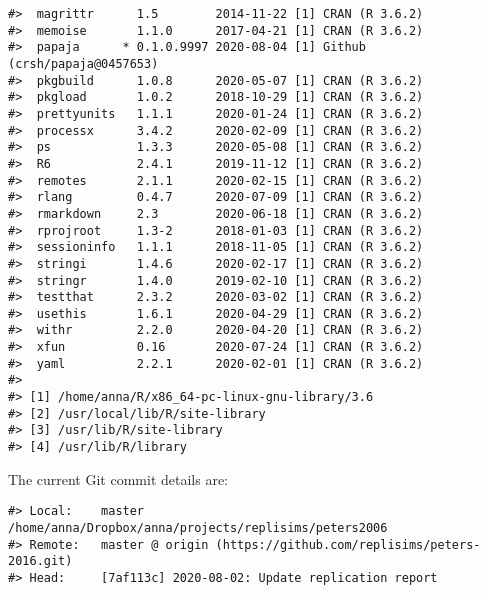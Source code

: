\documentclass[english,doc,floatsintext]{apa6}
\begin{document}
\begin{verbatim}
#>  magrittr      1.5        2014-11-22 [1] CRAN (R 3.6.2)              
#>  memoise       1.1.0      2017-04-21 [1] CRAN (R 3.6.2)              
#>  papaja      * 0.1.0.9997 2020-08-04 [1] Github (crsh/papaja@0457653)
#>  pkgbuild      1.0.8      2020-05-07 [1] CRAN (R 3.6.2)              
#>  pkgload       1.0.2      2018-10-29 [1] CRAN (R 3.6.2)              
#>  prettyunits   1.1.1      2020-01-24 [1] CRAN (R 3.6.2)              
#>  processx      3.4.2      2020-02-09 [1] CRAN (R 3.6.2)              
#>  ps            1.3.3      2020-05-08 [1] CRAN (R 3.6.2)              
#>  R6            2.4.1      2019-11-12 [1] CRAN (R 3.6.2)              
#>  remotes       2.1.1      2020-02-15 [1] CRAN (R 3.6.2)              
#>  rlang         0.4.7      2020-07-09 [1] CRAN (R 3.6.2)              
#>  rmarkdown     2.3        2020-06-18 [1] CRAN (R 3.6.2)              
#>  rprojroot     1.3-2      2018-01-03 [1] CRAN (R 3.6.2)              
#>  sessioninfo   1.1.1      2018-11-05 [1] CRAN (R 3.6.2)              
#>  stringi       1.4.6      2020-02-17 [1] CRAN (R 3.6.2)              
#>  stringr       1.4.0      2019-02-10 [1] CRAN (R 3.6.2)              
#>  testthat      2.3.2      2020-03-02 [1] CRAN (R 3.6.2)              
#>  usethis       1.6.1      2020-04-29 [1] CRAN (R 3.6.2)              
#>  withr         2.2.0      2020-04-20 [1] CRAN (R 3.6.2)              
#>  xfun          0.16       2020-07-24 [1] CRAN (R 3.6.2)              
#>  yaml          2.2.1      2020-02-01 [1] CRAN (R 3.6.2)              
#> 
#> [1] /home/anna/R/x86_64-pc-linux-gnu-library/3.6
#> [2] /usr/local/lib/R/site-library
#> [3] /usr/lib/R/site-library
#> [4] /usr/lib/R/library
\end{verbatim}

The current Git commit details are:

\begin{verbatim}
#> Local:    master /home/anna/Dropbox/anna/projects/replisims/peters2006
#> Remote:   master @ origin (https://github.com/replisims/peters-2016.git)
#> Head:     [7af113c] 2020-08-02: Update replication report
\end{verbatim}
\end{document}
